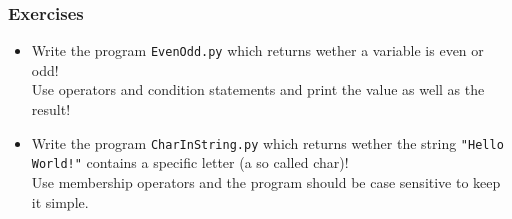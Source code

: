\documentclass{beamer}
\begin{document}
\begin{frame}
\frametitle{Exercises}
	\begin{itemize}
		\item Write the program \texttt{EvenOdd.py} which returns wether a variable is even or odd! \\ Use operators and condition statements and print the value as well as the result!
		\item Write the program \texttt{CharInString.py} which returns wether the string \texttt{"Hello World!"} contains a specific letter (a so called char)! \\ Use membership operators and the program should be case sensitive to keep it simple.
	\end{itemize}
	
\end{frame}
\end{document}
